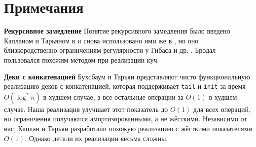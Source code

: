 \section{Примечания}
\label{sc:11.3}

\noindent
\textbf{Рекурсивное замедление} Понятие рекурсивного замедления было
введено Капланом и Тарьяном в \cite{KaplanTarjan1995} и снова
использовано ими же в \cite{KaplanTarjan1996b}, но оно
близкородственно ограничениям регулярности у Гибаса и
др. \cite{Guibas-etal1977}. Бродал \cite{Brodal1995} пользовался
похожим методом при реализации куч.

\textbf{Деки с конкатенацией} Бухсбаум и Тарьян
\cite{BuchsbaumTarjan1995} представляют чисто функциональную
реализацию деков с конкатенацией, которая поддерживает
\lstinline!tail! и \lstinline!init! за время $O(\log^* n)$ в худшем
случае, а все остальные операции за $O(1)$ в худшем случае. Наша
реализация улучшает этот показатель до $O(1)$ для всех операций, но
ограничения получаются амортизированными, а не жёсткими. Независимо от
нас, Каплан и Тарьян разработали похожую реализацию с жёсткими
показателями $O(1)$. Однако детали их реализации весьма сложны.


